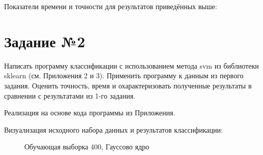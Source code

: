 \documentclass{article} %
\begin{document}
Показатели времени и точности для результатов приведённых выше:

\bigskip

\section{Задание №2}
Написать программу классификации с использованием метода svm из библиотеки
sklearn (см. Приложения 2 и 3). Применить программу к данным из первого задания.
Оценить точность, время и охарактеризовать полученные результаты в сравнении с
результатами из 1-го задания.

Реализация на основе кода программы из Приложения.

\clearpage
Визуализация исходного набора данных и результатов классификации:
\begin{figure}[H]
	\centering
	\hfill
    \caption{Обучающая выборка 400, Гауссово ядро}
\end{figure}
\end{document}
